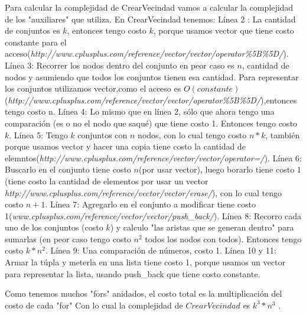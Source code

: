 \documentclass[a4paper]{article}
\begin{document}
Para calcular la complejidad de CrearVecindad vamos a calcular la complejidad de los "auxiliares" que utiliza.\newline
En CrearVecindad tenemos: \newline
Línea 2 : La cantidad de conjuntos es $k$, entonces tengo costo $k$, porque usamos vector que tiene costo constante para el acceso(\textit{http://www.cplusplus.com/reference/vector/vector/operator\%5B\%5D/}).\newline
Línea 3: Recorrer los nodos dentro del conjunto en peor caso es $n$, cantidad de nodos y asumiendo que todos los conjuntos tienen esa cantidad. Para representar los conjuntos utilizamos vector,como el acceso es $O(constante)$(\textit{http://www.cplusplus.com/reference/vector/vector/operator\%5B\%5D/}),entonces tengo costo n.\newline
Línea 4: Lo mismo que en línea 2, sólo que ahora tengo una comparación (es o no el nodo que saqué) que tiene costo 1. Entonces tengo costo $k$.\newline
Línea 5: Tengo $k$ conjuntos con $n$ nodos, con lo cual tengo costo $n*k$, también porque usamos vector y hacer una copia tiene costo la cantidad de elemntos(\textit{http://www.cplusplus.com/reference/vector/vector/operator=/}).\newline
Línea 6: Buscarlo en el conjunto tiene costo $n$(por usar vector), luego borarlo tiene costo $1$(tiene costo la cantidad de elementos por usar un vector \textit{http://www.cplusplus.com/reference/vector/vector/erase/}), con lo cual tengo costo $n+1$.\newline
Línea 7: Agregarlo en el conjunto a modificar tiene costo 1\newline(\textit{www.cplusplus.com/reference/vector/vector/push\_back/}).\newline
Línea 8: Recorro cada uno de los conjuntos (costo $k$) y 
calculo "las aristas que se generan dentro" para sumarlas (en peor caso tengo costo $n^{2}$ todos los nodos con todos). Entonces tengo costo $k*n^{2}$. \newline
Línea 9: Una comparación de números, costo 1.\newline
Línea 10 y 11: Armar la túpla y meterla en una lista tiene costo 1, porque usamos un vector para representar la lista, usando push\_back que tiene costo constante. \newline

Como tenemos muchos "fors" anidados, el costo total es la multiplicación del costo de cada "for"
Con lo cual la complejidad de $CrearVecindad$ es $k^{3}*n^{3}$ .
\end{document}
